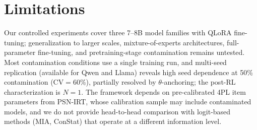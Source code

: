 \section*{Limitations}

Our controlled experiments cover three 7--8B model families with QLoRA fine-tuning; generalization to larger scales, mixture-of-experts architectures, full-parameter fine-tuning, and pretraining-stage contamination remains untested.
Most contamination conditions use a single training run, and multi-seed replication (available for Qwen and Llama) reveals high seed dependence at 50\% contamination (CV${=}$60\%), partially resolved by $\theta$-anchoring; the post-RL characterization is $N{=}1$.
The framework depends on pre-calibrated 4PL item parameters from PSN-IRT, whose calibration sample may include contaminated models, and we do not provide head-to-head comparison with logit-based methods (MIA, ConStat) that operate at a different information level.
